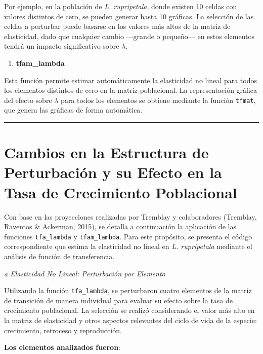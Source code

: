 \documentclass[
  12pt,
  letterpaper,
]{book}
\providecommand{\tightlist}{%
  \setlength{\itemsep}{0pt}\setlength{\parskip}{0pt}}\usepackage{longtable,booktabs,array}
\begin{document}
Por ejemplo, en la población de \emph{L. rupripetala}, donde existen 10
celdas con valores distintos de cero, se pueden generar hasta 10
gráficas. La selección de las celdas a perturbar puede basarse en los
valores más altos de la matriz de elasticidad, dado que cualquier cambio
---grande o pequeño--- en estos elementos tendrá un impacto
significativo sobre \(\lambda\).

\begin{enumerate}
\def\labelenumi{\alph{enumi})}
\setcounter{enumi}{1}
\tightlist
\item
  \textbf{tfam\_lambda}
\end{enumerate}

Esta función permite estimar automáticamente la elasticidad no lineal
para todos los elementos distintos de cero en la matriz poblacional. La
representación gráfica del efecto sobre \(\lambda\) para todos los
elementos se obtiene mediante la función \texttt{tfmat}, que genera las
gráficas de forma automática.

\begin{center}\rule{0.5\linewidth}{0.5pt}\end{center}

\section{Cambios en la Estructura de Perturbación y su Efecto en la Tasa
de Crecimiento
Poblacional}\label{cambios-en-la-estructura-de-perturbaciuxf3n-y-su-efecto-en-la-tasa-de-crecimiento-poblacional}

Con base en las proyecciones realizadas por Tremblay y colaboradores
(Tremblay, Raventos \& Ackerman, 2015), se detalla a continuación la
aplicación de las funciones \texttt{tfa\_lambda} y
\texttt{tfam\_lambda}. Para este propósito, se presenta el código
correspondiente que estima la elasticidad no lineal en \emph{L.
rupripetala} mediante el análisis de función de transferencia.

\emph{a Elasticidad No Lineal: Perturbación por Elemento}

Utilizando la función \texttt{tfa\_lambda}, se perturbaron cuatro
elementos de la matriz de transición de manera individual para evaluar
su efecto sobre la tasa de crecimiento poblacional. La selección se
realizó considerando el valor más alto en la matriz de elasticidad y
otros aspectos relevantes del ciclo de vida de la especie: crecimiento,
retroceso y reproducción.

\textbf{Los elementos analizados fueron}:
\end{document}
